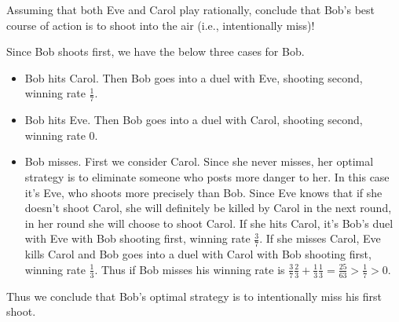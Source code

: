 \documentclass[11pt]{article}
\begin{document}
\begin{Parts}
    \newpage
    \Part Assuming that both Eve and Carol play rationally, conclude that Bob’s best course of action is to shoot into 
          the air (i.e., intentionally miss)!
    \begin{Answer}
        Since Bob shoots first, we have the below three cases for Bob. 
        \begin{itemize}
            \item Bob hits Carol. Then Bob goes into a duel with Eve, shooting second, winning rate $\frac{1}{7}$. 
            \item Bob hits Eve. Then Bob goes into a duel with Carol, shooting second, winning rate $0$. 
            \item Bob misses. First we consider Carol. Since she never misses, her optimal strategy is to eliminate 
                  someone who posts more danger to her. In this case it's Eve, who shoots more precisely than Bob. 
                  Since Eve knows that if she doesn't shoot Carol, she will definitely be killed by Carol in the next 
                  round, in her round she will choose to shoot Carol. If she hits Carol, it's Bob's duel with Eve with 
                  Bob shooting first, winning rate $\frac{3}{7}$. If she misses Carol, Eve kills Carol and Bob goes into 
                  a duel with Carol with Bob shooting first, winning rate $\frac{1}{3}$. Thus if Bob misses his winning 
                  rate is $\frac{3}{7}\frac{2}{3} + \frac{1}{3}\frac{1}{3} = \frac{25}{63} > \frac{1}{7} > 0$. 
        \end{itemize}
        Thus we conclude that Bob's optimal strategy is to intentionally miss his first shoot.
    \end{Answer}

\end{Parts}

\newpage
{}
\end{document}

